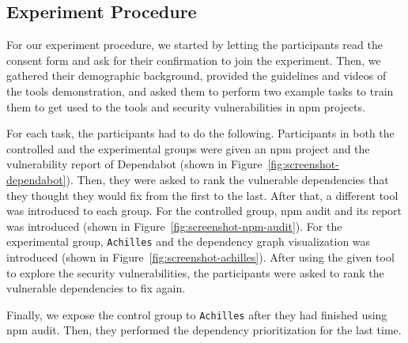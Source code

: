 \documentclass[conference]{IEEEtran}
\begin{document}
	\subsection{Experiment Procedure}
	
	For our experiment procedure, we started by letting the participants read the consent form and ask for their confirmation to join the experiment. Then, we gathered their demographic background, provided the guidelines and videos of the tools demonstration, and asked them to perform two example tasks to train them to get used to the tools and security vulnerabilities in npm projects.
	
	For each task, the participants had to do the following. Participants in both the controlled and the experimental groups were given an npm project and the vulnerability report of Dependabot (shown in Figure~\ref{fig:screenshot-dependabot}). Then, they were asked to rank the vulnerable dependencies that they thought they would fix from the first to the last. After that, a different tool was introduced to each group. For the controlled group, npm audit and its report was introduced (shown in Figure~\ref{fig:screenshot-npm-audit}). For the experimental group, \texttt{Achilles} and the dependency graph visualization was introduced (shown in Figure~\ref{fig:screenshot-achilles}). After using the given tool to explore the security vulnerabilities, the participants were asked to rank the vulnerable dependencies to fix again.
	
    Finally, we expose the control group to  \texttt{Achilles} after they had finished using npm audit. Then, they performed the dependency prioritization for the last time.
\end{document}
